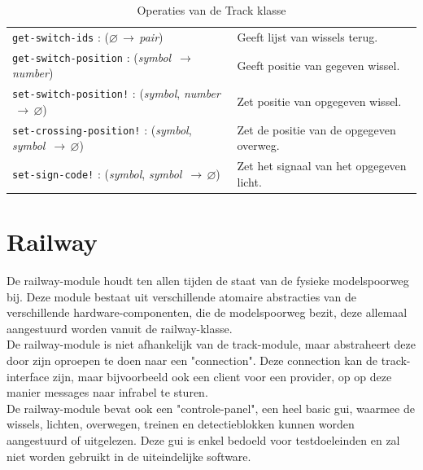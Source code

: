 \documentclass[a4paper, 11pt]{article}
\newcommand{\naar}{\,$\rightarrow$\,}
\renewcommand{\empty}{$\varnothing$}
\newcommand{\<}{\scriptsize\textless\normalsize}
\renewcommand{\>}{\scriptsize\textgreater\normalsize}
\begin{document}
\begin{table}[H]
\begin{center}
{\begin{tabular}{|l l|}
			\texttt{get-switch-ids} : (\empty \naar \textit{pair}) & Geeft lijst van wissels terug.\\
			\texttt{get-switch-position} : (\textit{symbol} \naar \textit{number}) & Geeft positie van gegeven wissel.\\
			\texttt{set-switch-position!} : (\textit{symbol}, \textit{number} \naar \empty) & Zet positie van opgegeven wissel.\\
			\texttt{set-crossing-position!} : (\textit{symbol}, \textit{symbol} \naar \empty) & Zet de positie van de opgegeven overweg.\\
			\texttt{set-sign-code!} : (\textit{symbol}, \textit{symbol} \naar \empty) & Zet het signaal van het opgegeven licht.\\
			\hline
		\end{tabular}}
		\caption{Operaties van de Track klasse}
	\end{center}
\end{table}

\newpage
\section{Railway} %
De railway-module houdt ten allen tijden de staat van de fysieke modelspoorweg bij. Deze module bestaat uit verschillende atomaire abstracties van de verschillende hardware-componenten, die de modelspoorweg bezit, deze allemaal aangestuurd worden vanuit de railway-klasse.
\newline\\
De railway-module is niet afhankelijk van de track-module, maar abstraheert deze door zijn oproepen te doen naar een "connection". Deze connection kan de track-interface zijn, maar bijvoorbeeld ook een client voor een provider, op op deze manier messages naar infrabel te sturen.
\newline\\
De railway-module bevat ook een "controle-panel", een heel basic gui, waarmee de wissels, lichten, overwegen, treinen en detectieblokken kunnen worden aangestuurd of uitgelezen. Deze gui is enkel bedoeld voor testdoeleinden en zal niet worden gebruikt in de uiteindelijke software.

\end{document}
